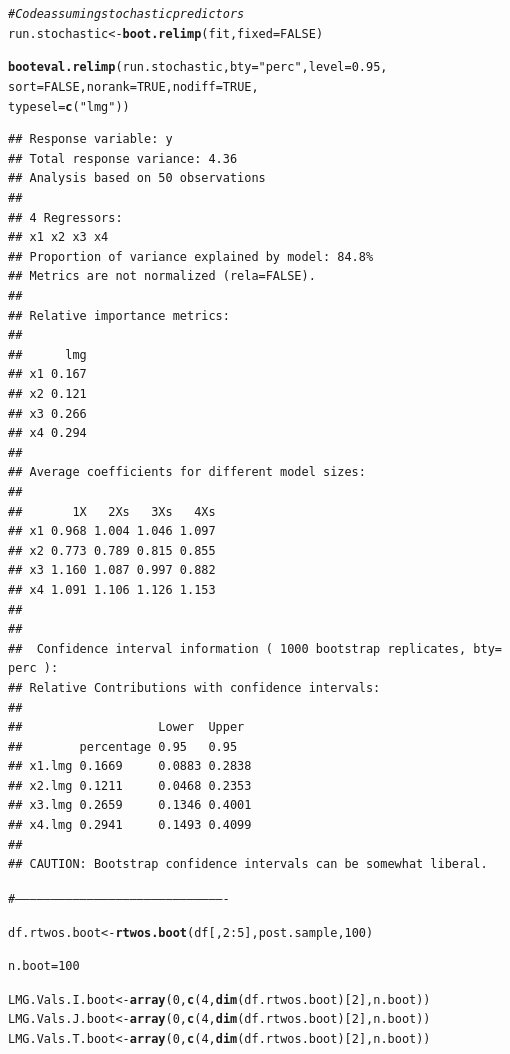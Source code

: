 \documentclass[11pt,a4paper,twoside]{book}\usepackage[]{graphicx}\usepackage[]{color}
\makeatletter
\newcommand{\hlnum}[1]{\textcolor[rgb]{0.686,0.059,0.569}{#1}}%
\newcommand{\hlstr}[1]{\textcolor[rgb]{0.192,0.494,0.8}{#1}}%
\newcommand{\hlcom}[1]{\textcolor[rgb]{0.678,0.584,0.686}{\textit{#1}}}%
\newcommand{\hlopt}[1]{\textcolor[rgb]{0,0,0}{#1}}%
\newcommand{\hlstd}[1]{\textcolor[rgb]{0.345,0.345,0.345}{#1}}%
\newcommand{\hlkwb}[1]{\textcolor[rgb]{0.69,0.353,0.396}{#1}}%
\newcommand{\hlkwc}[1]{\textcolor[rgb]{0.333,0.667,0.333}{#1}}%
\newcommand{\hlkwd}[1]{\textcolor[rgb]{0.737,0.353,0.396}{\textbf{#1}}}%
\newenvironment{kframe}{%
 \def\at@end@of@kframe{}%
 \ifinner\ifhmode%
  \def\at@end@of@kframe{\end{minipage}}%
  \begin{minipage}{\columnwidth}%
 \fi\fi%
 \def\FrameCommand##1{\hskip\@totalleftmargin \hskip-\fboxsep
 \colorbox{shadecolor}{##1}\hskip-\fboxsep
     \hskip-\linewidth \hskip-\@totalleftmargin \hskip\columnwidth}%
 \MakeFramed {\advance\hsize-\width
   \@totalleftmargin\z@ \linewidth\hsize
   \@setminipage}}%
 {\par\unskip\endMakeFramed%
 \at@end@of@kframe}
\newenvironment{knitrout}{}{} %
\makeatother
\begin{document}
\begin{knitrout}
\color{fgcolor}\begin{kframe}
\begin{alltt}
\hlcom{#Code assuming stochastic predictors}
\hlstd{run.stochastic}\hlkwb{<-}\hlkwd{boot.relimp}\hlstd{(fit,} \hlkwc{fixed}\hlstd{=}\hlnum{FALSE}\hlstd{)}

\hlkwd{booteval.relimp}\hlstd{(run.stochastic,} \hlkwc{bty} \hlstd{=} \hlstr{"perc"}\hlstd{,} \hlkwc{level} \hlstd{=} \hlnum{0.95}\hlstd{,}
                \hlkwc{sort} \hlstd{=} \hlnum{FALSE}\hlstd{,} \hlkwc{norank} \hlstd{=} \hlnum{TRUE}\hlstd{,} \hlkwc{nodiff} \hlstd{=} \hlnum{TRUE}\hlstd{,}
                \hlkwc{typesel} \hlstd{=} \hlkwd{c}\hlstd{(}\hlstr{"lmg"}\hlstd{))}
\end{alltt}
\begin{verbatim}
## Response variable: y 
## Total response variance: 4.36 
## Analysis based on 50 observations 
## 
## 4 Regressors: 
## x1 x2 x3 x4 
## Proportion of variance explained by model: 84.8%
## Metrics are not normalized (rela=FALSE). 
## 
## Relative importance metrics: 
## 
##      lmg
## x1 0.167
## x2 0.121
## x3 0.266
## x4 0.294
## 
## Average coefficients for different model sizes: 
## 
##       1X   2Xs   3Xs   4Xs
## x1 0.968 1.004 1.046 1.097
## x2 0.773 0.789 0.815 0.855
## x3 1.160 1.087 0.997 0.882
## x4 1.091 1.106 1.126 1.153
## 
##  
##  Confidence interval information ( 1000 bootstrap replicates, bty= perc ): 
## Relative Contributions with confidence intervals: 
##  
##                   Lower  Upper
##        percentage 0.95   0.95  
## x1.lmg 0.1669     0.0883 0.2838
## x2.lmg 0.1211     0.0468 0.2353
## x3.lmg 0.2659     0.1346 0.4001
## x4.lmg 0.2941     0.1493 0.4099
## 
## CAUTION: Bootstrap confidence intervals can be somewhat liberal.
\end{verbatim}
\begin{alltt}
\hlcom{#----------------------------------------------------------------------------------------}


\hlstd{df.rtwos.boot} \hlkwb{<-}\hlkwd{rtwos.boot}\hlstd{(df[,}\hlnum{2}\hlopt{:}\hlnum{5}\hlstd{], post.sample,} \hlnum{100}\hlstd{)}

\hlstd{n.boot} \hlkwb{=} \hlnum{100}

\hlstd{LMG.Vals.I.boot}\hlkwb{<-}\hlkwd{array}\hlstd{(}\hlnum{0}\hlstd{,} \hlkwd{c}\hlstd{(}\hlnum{4}\hlstd{,}\hlkwd{dim}\hlstd{(df.rtwos.boot)[}\hlnum{2}\hlstd{], n.boot))}
\hlstd{LMG.Vals.J.boot}\hlkwb{<-}\hlkwd{array}\hlstd{(}\hlnum{0}\hlstd{,} \hlkwd{c}\hlstd{(}\hlnum{4}\hlstd{,}\hlkwd{dim}\hlstd{(df.rtwos.boot)[}\hlnum{2}\hlstd{], n.boot))}
\hlstd{LMG.Vals.T.boot}\hlkwb{<-}\hlkwd{array}\hlstd{(}\hlnum{0}\hlstd{,} \hlkwd{c}\hlstd{(}\hlnum{4}\hlstd{,}\hlkwd{dim}\hlstd{(df.rtwos.boot)[}\hlnum{2}\hlstd{], n.boot))}


\end{alltt}
\end{kframe}
\end{knitrout}
\end{document}
